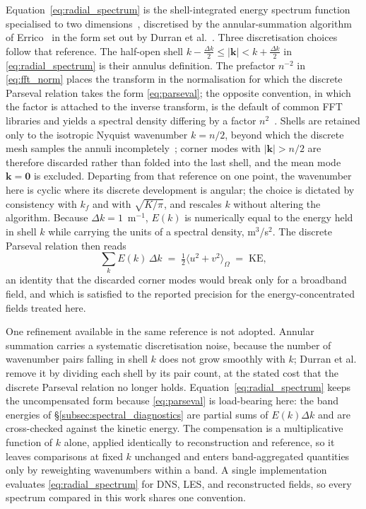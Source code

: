 Equation~\eqref{eq:radial_spectrum} is the shell-integrated energy spectrum function~\cite{Pope2000} specialised to two dimensions~\cite{Kraichnan1967,Boffetta2012ARFM}, discretised by the annular-summation algorithm of Errico~\cite{Errico1985} in the form set out by Durran et al.~\cite{Durran2017}. Three discretisation choices follow that reference. The half-open shell $k-\tfrac{\Delta k}{2}\le\vert\mathbf{k}\vert<k+\tfrac{\Delta k}{2}$ in \eqref{eq:radial_spectrum} is their annulus definition. The prefactor $n^{-2}$ in \eqref{eq:fft_norm} places the transform in the normalisation for which the discrete Parseval relation takes the form \eqref{eq:parseval}; the opposite convention, in which the factor is attached to the inverse transform, is the default of common FFT libraries and yields a spectral density differing by a factor $n^{2}$~\cite{Durran2017}. Shells are retained only to the isotropic Nyquist wavenumber $k = n/2$, beyond which the discrete mesh samples the annuli incompletely~\cite{Durran2017}; corner modes with $\vert\mathbf{k}\vert > n/2$ are therefore discarded rather than folded into the last shell, and the mean mode $\mathbf{k}=\mathbf{0}$ is excluded. Departing from that reference on one point, the wavenumber here is cyclic where its discrete development is angular; the choice is dictated by consistency with $k_f$ and with $\sqrt{K/\pi}$, and rescales $k$ without altering the algorithm. Because $\Delta k = 1$~m$^{-1}$, $E(k)$ is numerically equal to the energy held in shell $k$ while carrying the units of a spectral density, m$^3$/s$^2$. The discrete Parseval relation then reads
\begin{equation}
    \sum_k E(k)\,\Delta k \;=\; \tfrac{1}{2}\big\langle u^2 + v^2 \big\rangle_{\Omega} \;=\; \mathrm{KE},
    \label{eq:parseval}
\end{equation}
an identity that the discarded corner modes would break only for a broadband field, and which is satisfied to the reported precision for the energy-concentrated fields treated here.

One refinement available in the same reference is not adopted. Annular summation carries a systematic discretisation noise, because the number of wavenumber pairs falling in shell $k$ does not grow smoothly with $k$; Durran et al.~\cite{Durran2017} remove it by dividing each shell by its pair count, at the stated cost that the discrete Parseval relation no longer holds. Equation~\eqref{eq:radial_spectrum} keeps the uncompensated form because \eqref{eq:parseval} is load-bearing here: the band energies of \S\ref{subsec:spectral_diagnostics} are partial sums of $E(k)\Delta k$ and are cross-checked against the kinetic energy. The compensation is a multiplicative function of $k$ alone, applied identically to reconstruction and reference, so it leaves comparisons at fixed $k$ unchanged and enters band-aggregated quantities only by reweighting wavenumbers within a band. A single implementation evaluates \eqref{eq:radial_spectrum} for DNS, LES, and reconstructed fields, so every spectrum compared in this work shares one convention.

